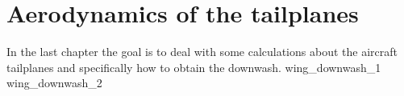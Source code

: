 \documentclass[[12pt,twoside]{book}
\begin{document}
%
%
\chapter%
   [Aerodynamics of the tailplanes ]%
   {Aerodynamics of the tailplanes }
\label{chap:Wing}

\setcounter{minitocdepth}{2}%
\minitoc %

\vspace{\baselineskip}

\noindent
In the last chapter the goal is to deal  with some calculations about the aircraft tailplanes and specifically how to obtain the downwash.
%
{wing_downwash_1}
{wing_downwash_2}
\end{document}
